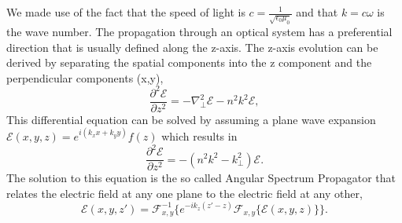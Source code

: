 \documentclass[letterpaper]{ar-1col}
\begin{document}
We made use of the fact that the speed of light is $c = \frac{1}{\sqrt{\epsilon_0\mu_0}}$ and that $k = c\omega$ is the wave number.
%
The propagation through an optical system has a preferential direction that is usually defined along the z-axis.
%
The z-axis evolution can be derived by separating the spatial components into the z component and the perpendicular components (x,y),
\begin{equation}
\frac{\partial^2\mathcal{E}}{\partial z^2} = -\nabla_{\perp}^2\mathcal{E}-n^2k^2 \mathcal{E},
\end{equation}
This differential equation can be solved by assuming a plane wave expansion $\mathcal{E}(x,y,z)=e^{i(k_x x + k_y y)}f(z)$ which results in
\begin{equation}
\frac{\partial^2\mathcal{E}}{\partial z^2} = -(n^2k^2 - k_{\perp}^2)\mathcal{E}.
\end{equation}
The solution to this equation is the so called Angular Spectrum Propagator that relates the electric field at any one plane to the electric field at any other,
\begin{equation}
\label{eq:angular_spectrum}
\mathcal{E}(x, y, z') = \mathcal{F}_{x,y}^{-1}\{e^{-ik_z(z'-z)}\mathcal{F}_{x,y}\{\mathcal{E}(x,y,z)\}\}.
\end{equation}
\end{document}
